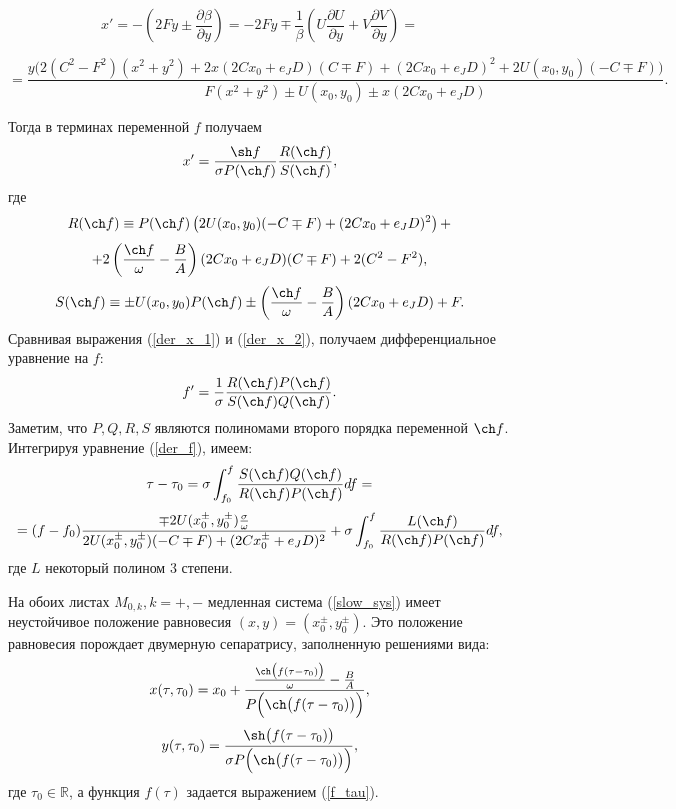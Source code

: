 $$x' = -\left( 2Fy \pm \frac{\partial \beta}{\partial y} \right) = -2Fy \mp \frac{1}{\beta} \left( U \frac{\partial U}{\partial y} + V \frac{\partial V}{\partial y} \right) = $$

$$ = \frac{y \Big(2(C^2-F^2)(x^2+y^2) + 2x(2Cx_0+e_J D)(C \mp F) + (2Cx_0+e_J D)^2 + 2U(x_0, y_0)(-C \mp F)  \Big)}{F(x^2+y^2) \pm U(x_0, y_0) \pm x(2Cx_0+e_J D)}.$$

Тогда в терминах переменной $f$ получаем
\begin{equation}
\label{der_x_2}
x' = \frac{\sh f}{\sigma P(\ch f)} \frac{R(\ch f)}{S(\ch f)},
\end{equation}
где
$$R(\ch f) \equiv P(\ch f) \left( 2 U(x_0,y_0)(-C \mp F)+(2Cx_0+e_J D)^2 \right) +$$ 
$$ + 2 \left( \frac{\ch f}{\omega} - \frac{B}{A} \right)(2Cx_0 + e_J D)(C \mp F) + 2(C^2-F^2),$$
$$S(\ch f) \equiv \pm U(x_0,y_0) P(\ch f) \pm \left( \frac{\ch f}{\omega} - \frac{B}{A}\right) (2Cx_0+e_J D) + F.$$
Сравнивая выражения (\ref{der_x_1}) и (\ref{der_x_2}), получаем дифференциальное уравнение на $f$:
\begin{equation}
\label{der_f}
f' = \frac{1}{\sigma} \frac{R(\ch f) P(\ch f)}{S(\ch f)Q(\ch f)}.
\end{equation}
Заметим, что $P, Q, R, S$ являются полиномами второго порядка переменной $\ch f$.
Интегрируя уравнение (\ref{der_f}), имеем:
\begin{equation*}
\tau -\tau_0 = \sigma \int_{f_0}^f \frac{S(\ch f) Q(\ch f)}{R(\ch f)P(\ch f)} df = 
\end{equation*}
\begin{equation} = (f-f_0)\frac{\mp 2U(x_0^{\pm}, y_0^{\pm}) \frac{\sigma}{\omega}}{2U(x_0^{\pm},y_0^{\pm})(-C \mp F)+(2Cx_0^{\pm} + e_J D)^2} + \sigma \int_{f_0}^f \frac{L(\ch f)}{R(\ch f) P(\ch f)} df,
\label{f_tau}
\end{equation}
где $L$ некоторый полином 3 степени.

\begin{utv}
На обоих листах $M_{0,k}, k=+,-$ медленная система (\ref{slow_sys}) имеет неустойчивое положение равновесия $(x,y) = (x_0^{\pm},y_0^{\pm})$. Это положение равновесия порождает двумерную сепаратрису, заполненную решениями вида:
$$x(\tau,\tau_{0}) = x_0 + \frac{\frac{\ch \big( f(\tau-\tau_{0}) \big)}{\omega} - \frac{B}{A}}{P \Big(\ch \big( f (\tau-\tau_{0}) \big) \Big)},$$
$$y(\tau, \tau_{0}) = \frac{\sh \big( f(\tau-\tau_{0}) \big)}{\sigma P\Big(\ch \big( f (\tau-\tau_{0}) \big) \Big)},$$
где $\tau_{0}\in \mathbb{R}$, а функция $f(\tau)$ задается выражением (\ref{f_tau}).
\end{utv}